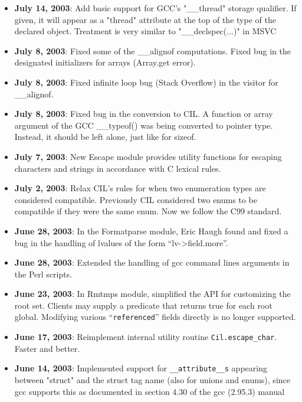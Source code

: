 \documentclass[letterpaper]{article}
\def\t#1{{\tt #1}}
\begin{document}
\begin{itemize}
\item {\bf July 14, 2003}: Add basic support for GCC's "\_\_thread" storage
qualifier. If given, it will appear as a "thread" attribute at the top of the
type of the declared object. Treatment is very similar to "\_\_declspec(...)"
in MSVC

\item {\bf July 8, 2003}: Fixed some of the \_\_alignof computations. Fixed
  bug in the designated initializers for arrays (Array.get error).
\item {\bf July 8, 2003}: Fixed infinite loop bug (Stack Overflow) in the
  visitor for \_\_alignof.
\item {\bf July 8, 2003}: Fixed bug in the conversion to CIL. A function or
  array argument of
  the GCC \_\_typeof() was being converted to pointer type. Instead, it should
  be left alone, just like for sizeof.  
\item {\bf July 7, 2003}: New Escape module provides utility functions
  for escaping characters and strings in accordance with C lexical
  rules.

\item {\bf July 2, 2003}: Relax CIL's rules for when two enumeration types are
considered compatible. Previously CIL considered two enums to be compatible if
they were the same enum. Now we follow the C99 standard.


\item {\bf June 28, 2003}: In the Formatparse module, Eric Haugh found and
  fixed a bug in the handling of lvalues of the form ``lv->field.more''.

\item {\bf June 28, 2003}: Extended the handling of gcc command lines
arguments in the Perl scripts. 

\item {\bf June 23, 2003}: In Rmtmps module, simplified the API for
  customizing the root set.  Clients may supply a predicate that
  returns true for each root global.  Modifying various
  ``\texttt{referenced}'' fields directly is no longer supported.

\item {\bf June 17, 2003}: Reimplement internal utility routine
           \t{Cil.escape\_char}. Faster and better. 

\item {\bf June 14, 2003}: Implemented support for \t{\_\_attribute\_\_s}
appearing between "struct" and the struct tag name (also for unions and
enums), since gcc supports this as documented in section 4.30 of the gcc
(2.95.3) manual


\end{itemize}
\end{document}
